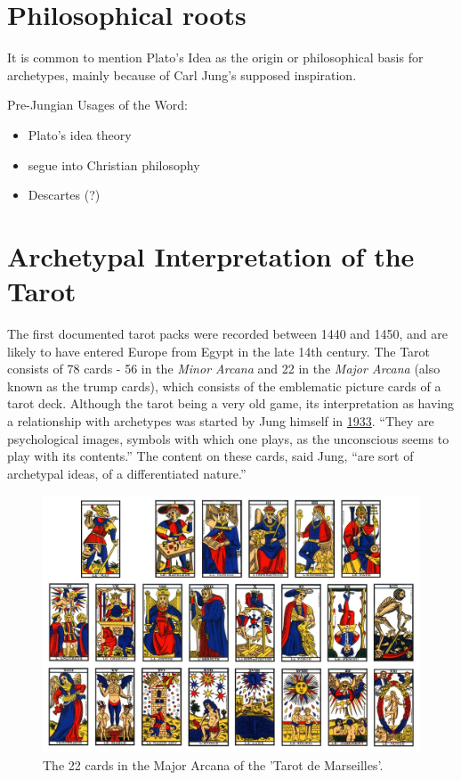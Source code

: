 \documentclass[
]{book}
\providecommand{\tightlist}{%
  \setlength{\itemsep}{0pt}\setlength{\parskip}{0pt}}
\begin{document}
\hypertarget{philosophical-roots}{%
\section{Philosophical roots}\label{philosophical-roots}}

It is common to mention Plato's Idea as the origin or philosophical basis for archetypes, mainly because of Carl Jung's supposed inspiration.

Pre-Jungian Usages of the Word:

\begin{itemize}
\tightlist
\item
  Plato's idea theory
\item
  segue into Christian philosophy
\item
  Descartes (?)
\end{itemize}

\hypertarget{archetypal-interpretation-of-the-tarot}{%
\section{Archetypal Interpretation of the Tarot}\label{archetypal-interpretation-of-the-tarot}}

The first documented tarot packs were recorded between 1440 and 1450, and are likely to have entered Europe from Egypt in the late 14th century. The Tarot consists of 78 cards - 56 in the \emph{Minor Arcana} and 22 in the \emph{Major Arcana} (also known as the trump cards), which consists of the emblematic picture cards of a tarot deck. Although the tarot being a very old game, its interpretation as having a relationship with archetypes was started by Jung himself in \href{https://marykgreer.com/2008/03/31/carl-jung-and-tarot/}{1933}. ``They are psychological images, symbols with which one plays, as the unconscious seems to play with its contents.'' The content on these cards, said Jung, ``are sort of archetypal ideas, of a differentiated nature.''

\begin{figure}

{\centering \includegraphics[width=\textwidth]{img/tarot} 

}

\caption{The 22 cards in the Major Arcana of the 'Tarot de Marseilles'.}\label{fig:unnamed-chunk-8}
\end{figure}
\end{document}
